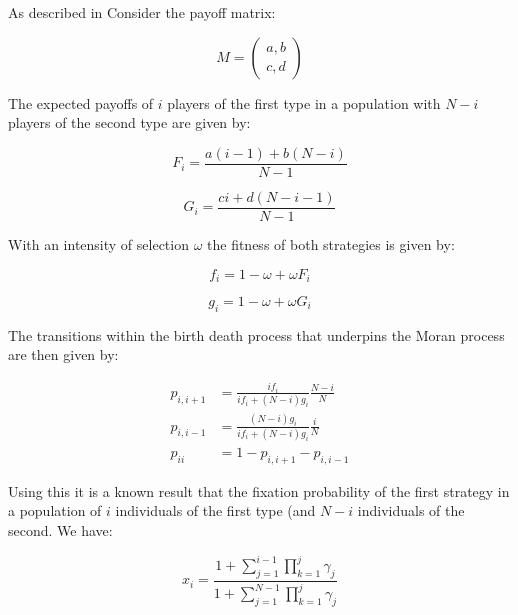 \documentclass{article}
\begin{document}
As described in \cite{Nowak} Consider the payoff matrix:

\begin{equation}\label{equ:payoff_matrix}
    M = \begin{pmatrix}
        a, b\\
        c, d
        \end{pmatrix}
\end{equation}

The expected payoffs of \(i\) players of the first type in a population with \(N
- i\) players of the second type are given by:

\begin{equation}\label{equ:expected_payoff_one}
    F_i = \frac{a(i - 1) + b(N - i)}{N - 1}
\end{equation}

\begin{equation}\label{equ:expected_payoff_two}
    G_i = \frac{ci + d(N - i - 1)}{N - 1}
\end{equation}

With an intensity of selection \(\omega\) the fitness of both strategies is
given by:

\begin{equation}\label{equ:expected_payoff_one}
    f_i = 1 - \omega + \omega F_i
\end{equation}

\begin{equation}\label{equ:expected_payoff_two}
    g_i = 1 - \omega + \omega G_i
\end{equation}

The transitions within the birth death process that underpins the Moran process
are then given by:

\begin{align}
	p_{i, i+1}&= \frac{if_i}{if_i+(N-i)g_i}\frac{N-i}{N}\label{equ:p_up}\\
	p_{i, i-1}&= \frac{(N-i)g_i}{if_i+(N-i)g_i}\frac{i}{N}\label{equ:p_down}\\
	p_{ii} &= 1 - p_{i, i+1} - p_{i, i-1}\label{equ:p_stay}
\end{align}

Using this it is a known result that the fixation probability of the first
strategy in a population of \(i\) individuals of the first type (and \(N-i\)
individuals of the second. We have:

\begin{equation}\label{equ:fixation_probability}
x_i = \frac{1 + \sum_{j=1}^{i-1}\prod_{k=1}^{j}\gamma_j}{1 + \sum_{j=1}^{N-1}
      \prod_{k=1}^{j}\gamma_j}
\end{equation}
\end{document}
